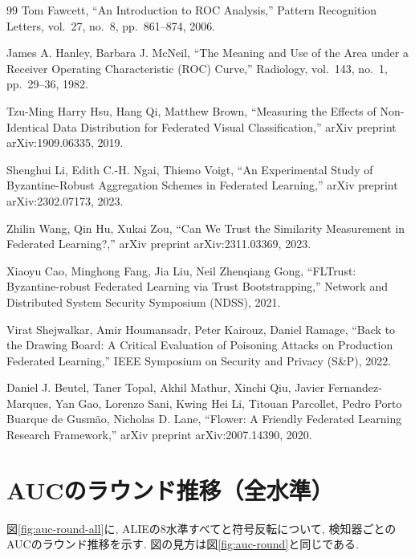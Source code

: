\documentclass[a4j, twocolumn, dvipdfmx]{jsarticle}
\begin{document}
\begin{thebibliography}{99}
Tom Fawcett,
``An Introduction to ROC Analysis,''
Pattern Recognition Letters, vol.~27, no.~8, pp.~861--874, 2006.

James A. Hanley, Barbara J. McNeil,
``The Meaning and Use of the Area under a Receiver Operating Characteristic (ROC) Curve,''
Radiology, vol.~143, no.~1, pp.~29--36, 1982.

Tzu-Ming Harry Hsu, Hang Qi, Matthew Brown,
``Measuring the Effects of Non-Identical Data Distribution for Federated Visual Classification,''
arXiv preprint arXiv:1909.06335, 2019.

Shenghui Li, Edith C.-H. Ngai, Thiemo Voigt,
``An Experimental Study of Byzantine-Robust Aggregation Schemes in Federated Learning,''
arXiv preprint arXiv:2302.07173, 2023.

Zhilin Wang, Qin Hu, Xukai Zou,
``Can We Trust the Similarity Measurement in Federated Learning?,''
arXiv preprint arXiv:2311.03369, 2023.

Xiaoyu Cao, Minghong Fang, Jia Liu, Neil Zhenqiang Gong,
``FLTrust: Byzantine-robust Federated Learning via Trust Bootstrapping,''
Network and Distributed System Security Symposium (NDSS), 2021.

Virat Shejwalkar, Amir Houmansadr, Peter Kairouz, Daniel Ramage,
``Back to the Drawing Board: A Critical Evaluation of Poisoning Attacks on Production Federated Learning,''
IEEE Symposium on Security and Privacy (S\&P), 2022.

Daniel J. Beutel, Taner Topal, Akhil Mathur, Xinchi Qiu, Javier Fernandez-Marques, Yan Gao, Lorenzo Sani, Kwing Hei Li, Titouan Parcollet, Pedro Porto Buarque de Gusm\~{a}o, Nicholas D. Lane,
``Flower: A Friendly Federated Learning Research Framework,''
arXiv preprint arXiv:2007.14390, 2020.

\end{thebibliography}

\onecolumn
\appendix
\section{AUCのラウンド推移（全水準）}
\label{sec:appendix-rounds}

図\ref{fig:auc-round-all}に, ALIEの8水準すべてと符号反転について, 検知器ごとのAUCのラウンド推移を示す. 図の見方は図\ref{fig:auc-round}と同じである.
\end{document}
